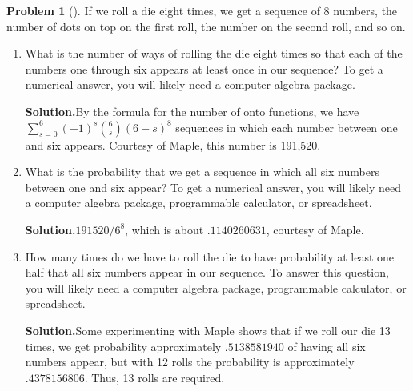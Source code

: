 \documentclass[10pt,]{book}
\theoremstyle{plain}
\theoremstyle{definition}
\newtheorem{activity}[project]{Problem}
\theoremstyle{definition}
\numberwithin{equation}{chapter}
\begin{document}
\begin{activity}[]\label{activity-240}
If we roll a die eight times, we get a sequence of 8 numbers, the number of dots on top on the first roll, the number on the second roll, and so on.%
\begin{enumerate}[font=\bfseries,label=(\alph*),ref=\alph*]
\item\label{task-174} What is the number of ways of rolling the die eight times so that each of the numbers one through six appears at least once in our sequence? To get a numerical answer, you will likely need a computer algebra package.%
\par\medskip\noindent%
\textbf{Solution.}\quad By the formula for the number of onto functions, we have \(\sum_{s=0}^6 (-1)^s\binom{6}{s}(6-s)^8\) sequences in which each number between one and six appears. Courtesy of Maple, this number is 191,520.%
\item\label{task-175} What is the probability that we get a sequence in which all six numbers between one and six appear? To get a numerical answer, you will likely need a computer algebra package, programmable calculator, or spreadsheet.%
\par\medskip\noindent%
\textbf{Solution.}\quad \(191520/6^8\), which is about \(.1140260631\), courtesy of Maple.%
\item\label{task-176} How many times do we have to roll the die to have probability at least one half that all six numbers appear in our sequence. To answer this question, you will likely need a computer algebra package, programmable calculator, or spreadsheet.%
\par\medskip\noindent%
\textbf{Solution.}\quad Some experimenting with Maple shows that if we roll our die 13 times, we get probability approximately \(.5138581940\) of having all six numbers appear, but with 12 rolls the probability is approximately \(.4378156806\). Thus, 13 rolls are required.%
\end{enumerate}
\end{activity}
\typeout{************************************************}
\typeout{************************************************}
\end{document}
